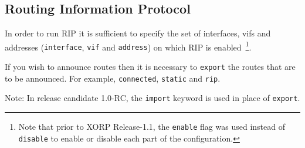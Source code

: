 \documentclass[11pt]{article}
\begin{document}
\subsection{Routing Information Protocol}
\label{sec:protocols:rip}

In order to run RIP it is sufficient to specify the set of interfaces,
vifs and addresses ({\tt interface}, {\tt vif} and {\tt address}) on
which RIP is enabled~\footnote{Note that prior to XORP Release-1.1,
the {\tt enable} flag was used instead of {\tt disable} to enable
or disable each part of the configuration.}.

If you wish to announce routes then it is necessary to {\tt export} the
routes that are to be announced. For example, {\tt connected},
{\tt static} and {\tt rip}.

Note: In release candidate 1.0-RC, the {\tt import} keyword is used in
place of {\tt export}.


\vspace{0.1in}
\noindent{}
\end{document}
